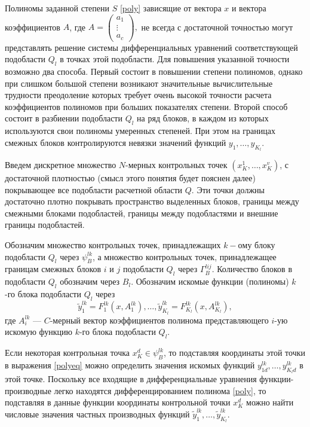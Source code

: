 \documentclass[a4paper,12pt]{article}
\begin{document}
Полиномы заданной степени $S$ \eqref{poly} зависящие от вектора $x$ и
вектора коэффициентов $A$, где $A=\left(\begin{matrix}a_1\\\vdots\\
a_c\end{matrix}\right),$ не всегда с достаточной точностью могут
представлять решение системы дифференциальных уравнений соответствующей
подобласти $Q_l$ в точках этой подобласти. Для повышения указанной
точности возможно два способа.  Первый состоит в повышении степени
полиномов, однако при слишком большой степени возникают значительные
вычислительные трудности преодоление которых требует очень высокой
точности расчета коэффициентов полиномов при больших показателях
степени. Второй способ состоит в разбиении подобласти $Q_l$ на ряд
блоков, в каждом из которых используются свои полиномы умеренных
степеней. При этом на границах смежных блоков контролируются невязки
значений функций $y_1,\ldots,y_{K_l}$.

Введем дискретное множество $N$-мерных контрольных точек
$(x^1_K,\ldots,x^v_K)$, с достаточной плотностью (смысл этого понятия
будет пояснен далее) покрывающее все подобласти расчетной области $Q$.
Эти точки должны достаточно плотно покрывать пространство выделенных
блоков, границы между смежными блоками подобластей, границы между
подобластями и внешние границы подобластей. 

Обозначим множество контрольных точек, принадлежащих $k-ому$ блоку 
подобласти $Q_l$ через $\psi^{lk}_B$, а множество контрольных точек,
принадлежащее границам смежных блоков $i$ и $j$ подобласти $Q_l$ через
$\Gamma^{lij}_B$. Количество блоков в подобласти $Q_l$ обозначим через
$B_l$. Обозначим искомые функции (полиномы) $k$-го блока подобласти
$Q_l$ через 
\begin{equation}
    \tilde{y}^{lk}_1 = F^{lk}_1(x,A^{lk}_1), \ldots,
    \tilde{y}^{lk}_{K_l} = F^{lk}_{K_l}(x,A^{lk}_{K_l}),
    \label{polyeq}
\end{equation}
где $A^{lk}_i$ --- $C$-мерный вектор коэффициентов полинома представляющего
$i$-ую искомую функцию $k$-го блока подобласти $Q_l$.

Если некоторая контрольная точка $x^d_K \in \psi^{lk}_B$, то подставляя
координаты этой точки в выражения \eqref{polyeq} можно определить
значения искомых функций $y^{lk}_{1d},\ldots,y^{lk}_{K_ld}$ в этой точке.
Поскольку все входящие в дифференциальные уравнения
функции-производные легко находятся дифференцированием полинома
\eqref{poly}, то подставляя в данные функции координаты контрольной
точки $x^d_K$ можно найти числовые значения частных производных
функций $\tilde{y}^{lk}_1, \ldots, \tilde{y}^{lk}_{K_l}$.
\end{document}
